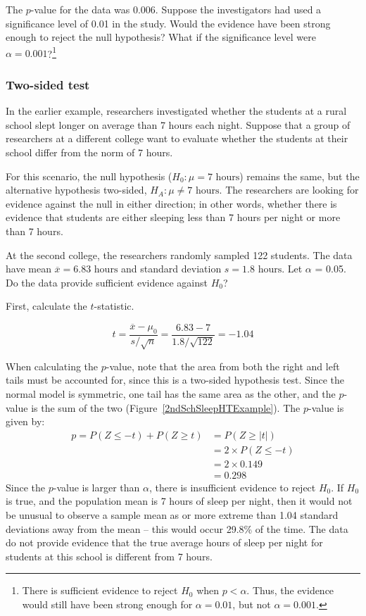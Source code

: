 \begin{spacing}{1.5}
\begin{exercise}
The $p$-value for the data was 0.006. Suppose the investigators had used a significance level of 0.01 in the study. Would the evidence have been strong enough to reject the null hypothesis? What if the significance level were $\alpha = 0.001$?\footnote{There is sufficient evidence to reject $H_{0}$ when $p < \alpha$. Thus, the evidence would still have been strong enough for $\alpha = 0.01$, but not $\alpha = 0.001$.}
\end{exercise}

\subsubsection{Two-sided test}

In the earlier example, researchers investigated whether the students at a rural school slept longer on average than 7 hours each night. Suppose that a group of researchers at a different college want to evaluate whether the students at their school differ from the norm of 7 hours. 

For this scenario, the null hypothesis ($H_0: \mu = 7 \text{ hours}$) remains the same, but the alternative hypothesis two-sided, $H_A: \mu \neq 7\text{ hours}$. The researchers are looking for evidence against the null in either direction; in other words, whether there is evidence that students are either sleeping less than 7 hours per night or more than 7 hours. 

\begin{example}{At the second college, the researchers randomly sampled 122 students. The data have mean $\overline{x} = 6.83 \text{ hours}$ and standard deviation $s = 1.8 \text{ hours}$. Let $\alpha$ = 0.05. Do the data provide sufficient evidence against $H_0$?} 
	
	First, calculate the $t$-statistic. 
	
	\[t=\frac{\overline{x}-\mu_0}{s/\sqrt{n}} = \frac{6.83 - 7}{1.8 / \sqrt{122}} = -1.04\]
	
	When calculating the $p$-value, note that the area from both the right and left tails must be accounted for, since this is a two-sided hypothesis test. Since the normal model is symmetric, one tail has the same area as the other, and the $p$-value is the sum of the two (Figure~\ref{2ndSchSleepHTExample}). The $p$-value is given by:
	\begin{align*}
	p = P(Z \leq -t) + P(Z \geq t) &= P(Z \geq |t|) \\
		&= 2 \times P(Z \leq -t) \\
		&= 2 \times 0.149 \\
		&= 0.298
	\end{align*}
Since the $p$-value is larger than $\alpha$, there is insufficient evidence to reject $H_0$. If $H_0$ is true, and the population mean is 7 hours of sleep per night, then it would not be unusual to observe a sample mean as or more extreme than 1.04 standard deviations away from the mean -- this would occur 29.8\% of the time. The data do not provide evidence that the true average hours of sleep per night for students at this school is different from 7 hours.
\end{example}
	

\end{spacing}
